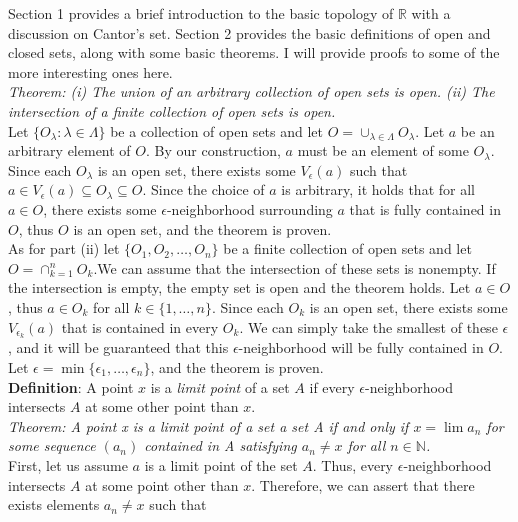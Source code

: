 \documentclass[12pt, letterpaper, twoside]{article}
\begin{document}
    
Section 1 provides a brief introduction to the basic topology of $\mathbb{R}$ with a discussion on Cantor's set. Section 2 provides the basic definitions of open and closed sets, along with some basic theorems. I will provide proofs to some of the more interesting ones here. \\

\textit{Theorem: (i) The union of an arbitrary collection of open sets is open. (ii) The intersection of a finite collection of open sets is open. }\\

Let $\{O_\lambda \colon \lambda \in \Lambda\}$ be a collection of open sets and let $O = \cup_{\lambda \in \Lambda} O_\lambda$. Let $a$ be an arbitrary element of $O$. By our construction, $a$ must be an element of some $O_\lambda$. Since each $O_\lambda$ is an open set, there exists some $V_\epsilon (a)$ such that $a \in V_\epsilon (a) \subseteq O_\lambda \subseteq O$. Since the choice of $a$ is arbitrary, it holds that for all $a \in O$, there exists some $\epsilon$-neighborhood surrounding $a$ that is fully contained in $O$, thus $O$ is an open set, and the theorem is proven. \\

As for part (ii) let $\{O_1 , O_2, \dots, O_n\}$ be a finite collection of open sets and let $O = \cap_{k=1}^n O_k$.We can assume that the intersection of these sets is nonempty. If the intersection is empty, the empty set is open and the theorem holds. Let $a \in O$, thus $a \in O_k$ for all $k \in \{1, \dots, n\}$. Since each $O_k$ is an open set, there exists some $V_{\epsilon_k} (a)$ that is contained in every $O_k$. We can simply take the smallest of these $\epsilon$, and it will be guaranteed that this $\epsilon$-neighborhood will be fully contained in $O$. Let $\epsilon = \min\{\epsilon_1, \dots, \epsilon_n\}$, and the theorem is proven. \\

\textbf{Definition}: A point $x$ is a \textit{limit point} of a set $A$ if every $\epsilon$-neighborhood intersects $A$ at some other point than $x$. \\

\textit{Theorem: A point x is a limit point of a set a set A if and only if $x=\lim a_n$ for some sequence $(a_n)$ contained in A satisfying $a_n \neq x$ for all $n \in \mathbb{N}$.} \\

First, let us assume $a$ is a limit point of the set $A$. Thus, every $\epsilon$-neighborhood intersects $A$ at some point other than $x$. Therefore, we can assert that there exists elements $a_n \neq x$ such that 
\end{document}
